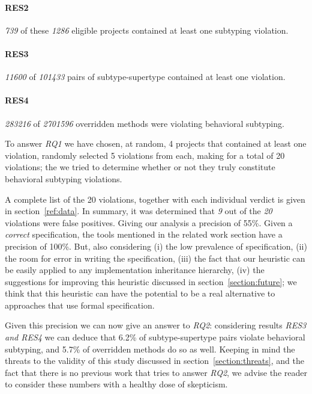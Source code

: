\documentclass{acm_proc_article-sp}
\begin{document}
\paragraph{RES2}
\emph{739} of these \emph{1286} eligible projects contained at least one subtyping violation.
\paragraph{RES3}
\emph{11600} of \emph{101433} pairs of subtype-supertype contained at least one violation.
\paragraph{RES4} \emph{283216} of \emph{2701596} overridden methods were violating behavioral subtyping.

To answer \emph{RQ1} we have chosen, at random, 4 projects that contained at least one violation, randomly selected 5 violations from each, making for a total of 20 violations; the we tried to determine whether or not they truly constitute behavioral subtyping violations.

 A complete list of the 20 violations, together with each individual verdict is given in section~\ref{ref:data}. In summary, it was determined that \emph{9} out of the \emph{20} violations were false positives. Giving our analysis a precision of 55\%. Given a \emph{correct} specification, the tools mentioned in the related work section have a precision of 100\%. But, also considering (i) the low prevalence of specification, (ii) the room for error in writing the specification, (iii) the fact that our heuristic can be easily applied to any implementation inheritance hierarchy, (iv) the suggestions for improving this heuristic discussed in section~\ref{section:future}; we think that this heuristic can have the potential to be a real alternative to approaches that use formal specification.
 
Given this precision we can now give an answer to \emph{RQ2}: considering results \emph{RES3 and RES4} we can deduce that 6.2\% of subtype-supertype pairs violate behavioral subtyping, and 5.7\% of overridden methods do so as well. Keeping in mind the threats to the validity of this study discussed in section~\ref{section:threats}, and the fact that there is no previous work that tries to answer \emph{RQ2}, we advise the reader to consider these numbers with a healthy dose of skepticism.
 
\end{document}
